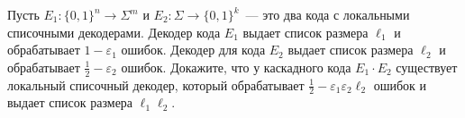 Пусть $E_1\colon \{0, 1\}^n \rightarrow \Sigma^m$ и $E_2\colon \Sigma \rightarrow \{0, 1\}^k$~--- это два
кода с локальными списочными декодерами. Декодер кода $E_1$ выдает список размера $\ell_1$ и обрабатывает
$1 - \varepsilon_1$ ошибок. Декодер для кода $E_2$ выдает список размера $\ell_2$ и обрабатывает
$\frac{1}{2} - \varepsilon_2$ ошибок. Докажите, что у каскадного кода $E_1 \cdot E_2$ существует
локальный списочный декодер, который обрабатывает $\frac{1}{2} - \varepsilon_1 \varepsilon_2 \ell_2$
ошибок и выдает список размера $\ell_1 \ell_2$.

